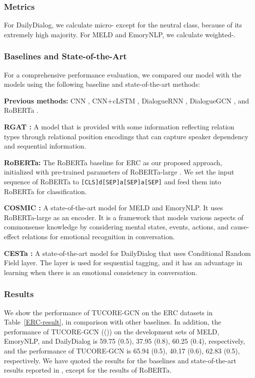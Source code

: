 \documentclass[11pt]{article}
\begin{document}
\subsubsection{Metrics}
For DailyDialog, we calculate micro- except for the neutral class, because of its extremely high majority. For MELD and EmoryNLP, we calculate weighted-.


\subsubsection{Baselines and State-of-the-Art}
For a comprehensive performance evaluation, we compared our model with the models using the following baseline and state-of-the-art methods: 

\textbf{Previous methods:} CNN \citep{kim-2014-convolutional}, CNN+cLSTM \citep{poria-etal-2017-context}, DialogueRNN \citep{MajumderPHMGC19}, DialogueGCN \citep{ghosal-etal-2019-dialoguegcn}, and RoBERTa \citep{liu2019roberta}. 


\textbf{RGAT \citep{ishiwatari-etal-2020-relation}:} A model that is provided with some information reflecting relation types through relational position encodings that can capture speaker dependency and sequential information. 

\textbf{RoBERTa:} The RoBERTa baseline for ERC as our proposed approach, initialized with pre-trained parameters of RoBERTa-large \citep{liu2019roberta}. We set the input sequence of RoBERTa to \texttt{[CLS]d[SEP]a[SEP]a[SEP]} and feed them into RoBERTa for classification.

\textbf{COSMIC \citep{ghosal-etal-2020-cosmic}:} A state-of-the-art model for MELD and EmoryNLP. It uses RoBERTa-large as an encoder. It is a framework that models various aspects of commonsense knowledge by considering mental states, events, actions, and cause-effect relations for emotional recognition in conversation.


\textbf{CESTa \citep{wang-etal-2020-contextualized}:} A state-of-the-art model for DailyDialog that uses Conditional Random Field layer. The layer is used for sequential tagging, and it has an advantage in learning when there is an emotional consistency in conversation.







\subsubsection{Results}
We show the performance of TUCORE-GCN on the ERC datasets in Table~\ref{ERC-result}, in comparison with other baselines. 
In addition, the performance of TUCORE-GCN (()) on the development sets of MELD, EmoryNLP, and DailyDialog is 59.75 (0.5), 37.95 (0.8), 60.25 (0.4), respectively, and the performance of TUCORE-GCN is 65.94 (0.5), 40.17 (0.6), 62.83 (0.5), respectively. We have quoted the results for the baselines and state-of-the-art results reported in \citep{ishiwatari-etal-2020-relation, ghosal-etal-2020-cosmic, wang-etal-2020-contextualized}, except for the results of RoBERTa.
\end{document}
